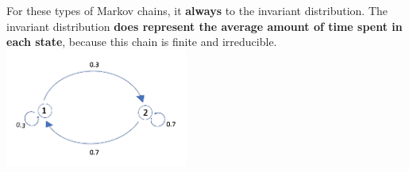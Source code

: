 \begin{enumerate}[label=(\alph*)]
\begin{solution}[2cm]
For these types of Markov chains, it \textbf{always} to the invariant distribution. The invariant distribution \textbf{does represent the average amount of time spent in each state}, because this chain is finite and irreducible. \\
\includegraphics[width=6cm]{aperiodic.png}
\end{solution}
\end{enumerate}